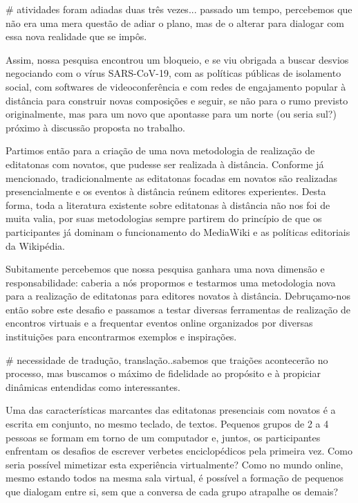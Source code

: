 # atividades foram adiadas duas três vezes... passado um tempo, percebemos que não era uma mera questão de adiar o plano, mas de o alterar para dialogar com essa nova realidade que se impôs.

Assim, nossa pesquisa encontrou um bloqueio, e se viu obrigada a buscar desvios negociando com o vírus SARS-CoV-19, com as políticas públicas de isolamento social, com softwares de videoconferência e com redes de engajamento popular à distância para construir novas composições e seguir, se não para o rumo previsto originalmente, mas para um novo que apontasse para um norte (ou seria sul?) próximo à discussão proposta no trabalho.

Partimos então para a criação de uma nova metodologia de realização de editatonas com novatos, que pudesse ser realizada à distância. Conforme já mencionado, tradicionalmente as editatonas focadas em novatos são realizadas presencialmente e os eventos à distância reúnem editores experientes. Desta forma, toda a literatura existente sobre editatonas à distância não nos foi de muita valia, por suas metodologias sempre partirem do princípio de que os participantes já dominam o funcionamento do MediaWiki e as políticas editoriais da Wikipédia.

Subitamente percebemos que nossa pesquisa ganhara uma nova dimensão e responsabilidade: caberia a nós propormos e testarmos uma metodologia nova para a realização de editatonas para editores novatos à distância. Debruçamo-nos então sobre este desafio e passamos a testar diversas ferramentas de realização de encontros virtuais e a frequentar eventos online organizados por diversas instituições para encontrarmos exemplos e inspirações.

# necessidade de tradução, translação..sabemos que traições acontecerão no processo, mas buscamos o máximo de fidelidade ao propósito e à propiciar dinâmicas entendidas como interessantes.

Uma das características marcantes das editatonas presenciais com novatos é a escrita em conjunto, no mesmo teclado, de textos. Pequenos grupos de 2 a 4 pessoas se formam em torno de um computador e, juntos, os participantes enfrentam os desafios de escrever verbetes enciclopédicos pela primeira vez. Como seria possível mimetizar esta experiência virtualmente? Como no mundo online, mesmo estando todos na mesma sala virtual, é possível a formação de pequenos que dialogam entre si, sem que a conversa de cada grupo atrapalhe os demais?

